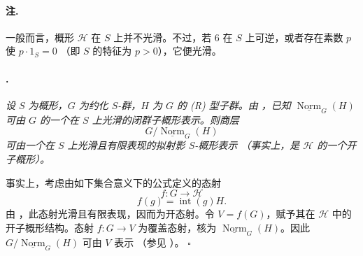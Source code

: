 \paragraph{注.}
一般而言，概形 \(\mathcal H\) 在 \(S\) 上并不光滑。不过，若 \(6\) 在 \(S\) 上可逆，或者存在素数 \(p\) 使 \(p\cdot1_S=0\) \textup{（即 \(S\) 的特征为 \(p>0\)）}，它便光滑。

\paragraph{.}
\textit{设 \(S\) 为概形，\(G\) 为约化 \(S\)-群，\(H\) 为 \(G\) 的 \textup{(R)} 型子群。由 ，已知 \(\underline{\operatorname{Norm}}_G(H)\) 可由 \(G\) 的一个在 \(S\) 上光滑的闭群子概形表示。则商层}
\[
  G/\underline{\operatorname{Norm}}_G(H)
\]
\textit{可由一个在 \(S\) 上光滑且有限表现的拟射影 \(S\)-概形表示 \textup{（事实上，是 \(\mathcal H\) 的一个开子概形）}。}

事实上，考虑由如下集合意义下的公式定义的态射
\[
  f\colon G\longrightarrow\mathcal H
\]
\[
  f(g)=\operatorname{int}(g)H.
\]
由 ，此态射光滑且有限表现，因而为开态射。令 \(V=f(G)\)，赋予其在 \(\mathcal H\) 中的开子概形结构。态射 \(f\colon G\to V\) 为覆盖态射，核为 \(\underline{\operatorname{Norm}}_G(H)\)。因此 \(G/\underline{\operatorname{Norm}}_G(H)\) 可由 \(V\) 表示 \textup{（参见 ）}。
\hfill\(\square\)

